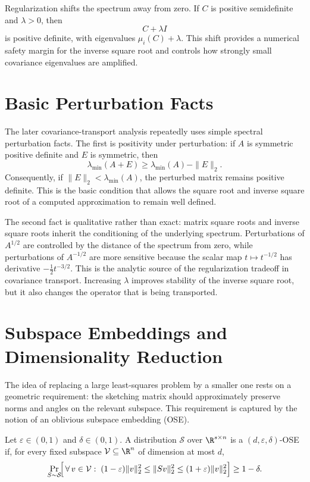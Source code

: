 Regularization shifts the spectrum away from zero. If \(C\) is positive
semidefinite and \(\lambda > 0\), then
\[
	C + \lambda I
\]
is positive definite, with eigenvalues \(\mu_i(C) + \lambda\). This shift provides a
numerical safety margin for the inverse square root and controls how strongly
small covariance eigenvalues are amplified.

\section{Basic Perturbation Facts}

The later covariance-transport analysis repeatedly uses simple spectral
perturbation facts. The first is positivity under perturbation: if \(A\) is symmetric
positive definite and \(E\) is symmetric, then
\[
	\lambda_{\min}(A+E) \ge \lambda_{\min}(A) - \|E\|_2.
\]
Consequently, if \(\|E\|_2 < \lambda_{\min}(A)\), the perturbed matrix remains
positive definite. This is the basic condition that allows the square root and
inverse square root of a computed approximation to remain well defined.

The second fact is qualitative rather than exact: matrix square roots and inverse
square roots inherit the conditioning of the underlying spectrum. Perturbations of
\(A^{1/2}\) are controlled by the distance of the spectrum from zero, while
perturbations of \(A^{-1/2}\) are more sensitive because the scalar map
\(t \mapsto t^{-1/2}\) has derivative \(-\tfrac12 t^{-3/2}\). This is the analytic source
of the regularization tradeoff in covariance transport. Increasing \(\lambda\)
improves stability of the inverse square root, but it also changes the operator that
is being transported.

\section{Subspace Embeddings and Dimensionality Reduction}

The idea of replacing a large least-squares problem by a smaller one rests on a
geometric requirement: the sketching matrix should approximately preserve norms
and angles on the relevant subspace. This requirement is captured by the notion
of an oblivious subspace embedding (OSE).

\begin{definition}
	\label{def:ose_background}
	Let \(\varepsilon \in (0,1)\) and \(\delta \in (0,1)\). A distribution
	\(\mathcal{S}\) over \(\R^{s \times n}\) is a \((d,\varepsilon,\delta)\)-OSE
	if, for every fixed subspace \(\mathcal{V} \subseteq \R^n\) of dimension at
	most \(d\),
	\[
		\Pr_{S \sim \mathcal{S}}\!\Bigl[\,\forall\, v \in \mathcal{V}:\;
			(1-\varepsilon)\|v\|_2^2 \le \|Sv\|_2^2 \le
			(1+\varepsilon)\|v\|_2^2\Bigr] \ge 1 - \delta.
	\]
\end{definition}

